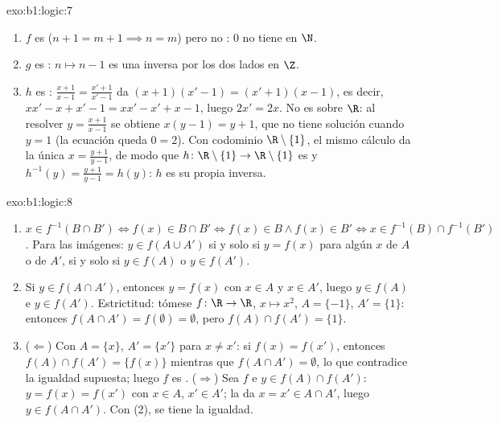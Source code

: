 \begin{solution}{exo:b1:logic:7}
\begin{enumerate}
  \item $f$ es  ($n + 1 = m + 1 \implies n = m$) pero no
        : $0$ no tiene  en $\N$.
  \item $g$ es : $n \mapsto n - 1$ es una inversa por los dos
        lados en $\Z$.
  \item $h$ es : $\frac{x+1}{x-1} = \frac{x'+1}{x'-1}$ da
        $(x+1)(x'-1) = (x'+1)(x-1)$, es decir, $xx' - x + x' - 1 = xx' -
        x' + x - 1$, luego $2x' = 2x$. No es  sobre $\R$:
        al resolver $y = \frac{x+1}{x-1}$ se obtiene $x(y - 1) = y + 1$,
        que no tiene solución cuando $y = 1$ (la ecuación queda
        $0 = 2$). Con codominio $\R \setminus \{1\}$, el mismo cálculo
        da la única  $x = \frac{y+1}{y-1}$, de modo que
        $h \colon \R \setminus \{1\} \to \R \setminus \{1\}$ es
         y $h^{-1}(y) = \frac{y+1}{y-1} = h(y)$: $h$ es su
        propia inversa.
\end{enumerate}
\end{solution}

\begin{solution}{exo:b1:logic:8}
\begin{enumerate}
  \item $x \in f^{-1}(B \cap B') \iff f(x) \in B \cap B' \iff f(x) \in
        B \land f(x) \in B' \iff x \in f^{-1}(B) \cap f^{-1}(B')$.
        Para las imágenes: $y \in f(A \cup A')$ si y solo si $y = f(x)$
        para algún $x$ de $A$ o de $A'$, si y solo si $y \in f(A)$ o
        $y \in f(A')$.
  \item Si $y \in f(A \cap A')$, entonces $y = f(x)$ con $x \in A$ y
        $x \in A'$, luego $y \in f(A)$ e $y \in f(A')$. Estrictitud:
        tómese $f \colon \R \to \R$, $x \mapsto x^2$, $A = \{-1\}$,
        $A' = \{1\}$: entonces $f(A \cap A') = f(\emptyset) = \emptyset$,
        pero $f(A) \cap f(A') = \{1\}$.
  \item ($\Leftarrow$) Con $A = \{x\}$, $A' = \{x'\}$ para $x \neq
        x'$: si $f(x) = f(x')$, entonces $f(A) \cap f(A') = \{f(x)\}$
        mientras que $f(A \cap A') = \emptyset$, lo que contradice la
        igualdad supuesta; luego $f$ es . ($\Rightarrow$) Sea
        $f$  e $y \in f(A) \cap f(A')$: $y = f(x) = f(x')$ con
        $x \in A$, $x' \in A'$; la  da $x = x' \in A \cap
        A'$, luego $y \in f(A \cap A')$. Con (2), se tiene la igualdad.
\end{enumerate}
\end{solution}

